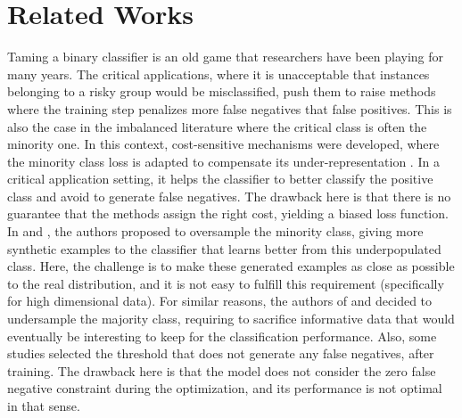\section{Related Works}
\label{Related Works}


Taming a binary classifier is an old game that researchers have been playing for many years. The critical applications, where it is unacceptable that instances belonging to a risky group would be misclassified, push them to raise methods where the training step penalizes more false negatives that false positives. This is also the case in the imbalanced literature where the critical class is often the minority one. In this context, cost-sensitive mechanisms were developed, where the minority class loss is adapted to compensate its under-representation \cite{cui2019class,ross2017focal,cao2019learning}. In a critical application setting, it helps the classifier to better classify the positive class and avoid to generate false negatives. The drawback here is that there is no guarantee that the methods assign the right cost, yielding a biased loss function. In \cite{chawla2002smote} and \cite{ahsan2022comparative}, the authors proposed to oversample the minority class, giving more synthetic examples to the classifier that learns better from this underpopulated class. Here, the challenge is to make these generated examples as close as possible to the real distribution, and it is not easy to fulfill this requirement (specifically for high dimensional data). For similar reasons, the authors of \cite{drummond2003c4} and \cite{fernandez2018learning} decided to undersample the majority class, requiring to sacrifice informative data that would eventually be interesting to keep for the classification performance. Also, some studies \cite{bougaham2021ganodip,roth2022towards} selected the threshold that does not generate any false negatives, after training. The drawback here is that the model does not consider the zero false negative constraint during the optimization, and its performance is not optimal in that sense. 

